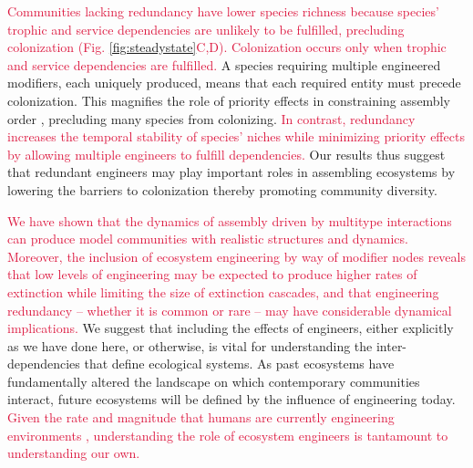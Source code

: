 \documentclass[twocolumn,preprintnumbers,amsmath,amssymb,superscriptaddress,linenumbers]{revtex4-1}
\newcommand{\rev}[1]{\textcolor{crimson}{#1}}
\begin{document}
\rev{Communities lacking redundancy have lower species richness because species' trophic and service dependencies are unlikely to be fulfilled, precluding colonization (Fig. \ref{fig:steadystate}C,D).
Colonization occurs only when trophic and service dependencies are fulfilled.}
A species requiring multiple engineered modifiers, each uniquely produced, means that each required entity must precede colonization.
This magnifies the role of priority effects in constraining assembly order \cite{Fukami2015}, precluding many species from colonizing.
\rev{In contrast, redundancy increases the temporal stability of species' niches while minimizing priority effects by allowing multiple engineers to fulfill dependencies.}
Our results thus suggest that redundant engineers may play important roles in assembling ecosystems by lowering the barriers to colonization thereby promoting community diversity.

\rev{We have shown that the dynamics of assembly driven by multitype interactions can produce model communities with realistic structures and dynamics.
Moreover, the inclusion of ecosystem engineering by way of modifier nodes reveals that low levels of engineering may be expected to produce higher rates of extinction while limiting the size of extinction cascades, and that engineering redundancy -- whether it is common or rare -- may have considerable dynamical implications.}
We suggest that including the effects of engineers, either explicitly as we have done here, or otherwise, is vital for understanding the inter-dependencies that define ecological systems.
As past ecosystems have fundamentally altered the landscape on which contemporary communities interact, future ecosystems will be defined by the influence of engineering today.
\rev{Given the rate and magnitude that humans are currently engineering environments \cite{Corlett2015}, understanding the role of ecosystem engineers is tantamount to understanding our own.}\\



\end{document}
